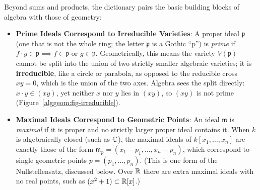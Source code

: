 Beyond sums and products, the dictionary pairs the basic building blocks of algebra with those of geometry:
\begin{itemize}
  \item \textbf{Prime Ideals Correspond to Irreducible Varieties}: A proper ideal $\mathfrak{p}$ (one that is not the whole ring; the letter $\mathfrak{p}$ is a Gothic ``p'') is \emph{prime} if $f \cdot g \in \mathfrak{p} \implies f \in \mathfrak{p} \text{ or } g \in \mathfrak{p}$. Geometrically, this means the variety $V(\mathfrak{p})$ cannot be split into the union of two strictly smaller algebraic varieties; it is \textbf{irreducible}, like a circle or parabola, as opposed to the reducible cross $xy = 0$, which is the union of the two axes. Algebra sees the split directly: $x \cdot y \in (xy)$, yet neither $x$ nor $y$ lies in $(xy)$, so $(xy)$ is not prime (Figure~\ref{alggeom:fig-irreducible}).
  \item \textbf{Maximal Ideals Correspond to Geometric Points}: An ideal $\mathfrak{m}$ is \emph{maximal} if it is proper and no strictly larger proper ideal contains it. When $k$ is algebraically closed (such as $\mathbb{C}$), the maximal ideals of $k[x_1, \dots, x_n]$ are exactly those of the form $\mathfrak{m}_p = (x_1 - p_1, \dots, x_n - p_n)$, which correspond to single geometric points $p = (p_1, \dots, p_n)$. (This is one form of the Nullstellensatz, discussed below. Over $\mathbb{R}$ there are extra maximal ideals with no real points, such as $(x^2 + 1) \subset \mathbb{R}[x]$.)
\end{itemize}

